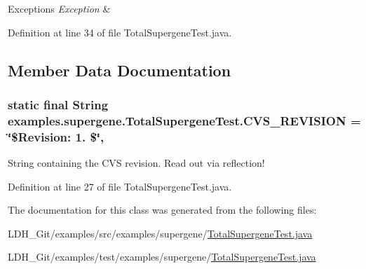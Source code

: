 \begin{DoxyExceptions}{Exceptions}
{\em Exception} & \\
\hline
\end{DoxyExceptions}


Definition at line 34 of file Total\-Supergene\-Test.\-java.



\subsection{Member Data Documentation}
\hypertarget{classexamples_1_1supergene_1_1_total_supergene_test_a567a9d68b902b0d7a016c18b2e09207d}{
\subsubsection[{C\-V\-S\-\_\-\-R\-E\-V\-I\-S\-I\-O\-N}]{\setlength{\rightskip}{0pt plus 5cm}static final String examples.\-supergene.\-Total\-Supergene\-Test.\-C\-V\-S\-\_\-\-R\-E\-V\-I\-S\-I\-O\-N = \char`\"{}\$Revision\-: 1. \$\char`\"{}\hspace{0.3cm}{\ttfamily [static]}, {\ttfamily [private]}}}\label{classexamples_1_1supergene_1_1_total_supergene_test_a567a9d68b902b0d7a016c18b2e09207d}
String containing the C\-V\-S revision. Read out via reflection! 

Definition at line 27 of file Total\-Supergene\-Test.\-java.



The documentation for this class was generated from the following files\-:\begin{DoxyCompactItemize}
\item 
L\-D\-H\-\_\-\-Git/examples/src/examples/supergene/\hyperlink{src_2examples_2supergene_2_total_supergene_test_8java}{Total\-Supergene\-Test.\-java}\item 
L\-D\-H\-\_\-\-Git/examples/test/examples/supergene/\hyperlink{test_2examples_2supergene_2_total_supergene_test_8java}{Total\-Supergene\-Test.\-java}\end{DoxyCompactItemize}
